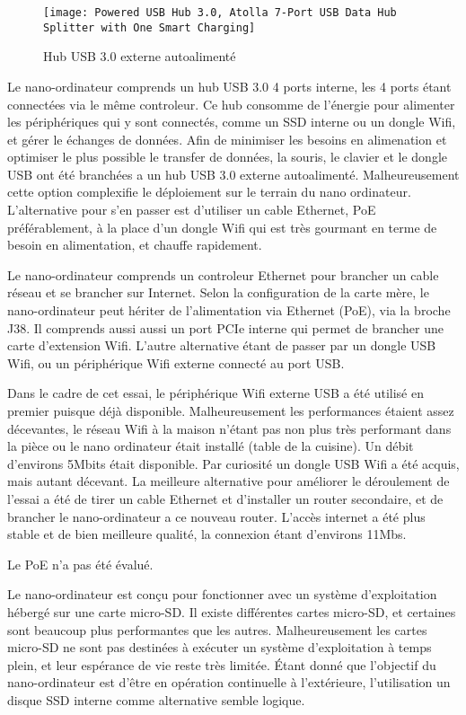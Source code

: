 \begin{figure}
    \centering
    \texttt{[image: Powered USB Hub 3.0, Atolla 7-Port USB Data Hub Splitter with One Smart Charging]}
    \caption{Hub USB 3.0 externe autoalimenté}
    \label{fig:hubusb}
\end{figure}
\par Le nano-ordinateur comprends un hub USB 3.0 4 ports interne, les 4 ports étant connectées via le même controleur. Ce hub consomme de l'énergie pour alimenter les périphériques qui y sont connectés, comme un SSD interne ou un dongle Wifi, et gérer le échanges de données. Afin de minimiser les besoins en alimenation et optimiser le plus possible le transfer de données, la souris, le clavier et le dongle USB ont été branchées a un hub USB 3.0 externe autoalimenté. Malheureusement cette option complexifie le déploiement sur le terrain du nano ordinateur. L'alternative pour s'en passer est d'utiliser un cable Ethernet, PoE préférablement, à la place d'un dongle Wifi qui est très gourmant en terme de besoin en alimentation, et chauffe rapidement.
\par Le nano-ordinateur comprends un controleur Ethernet pour brancher un cable réseau et se brancher sur Internet. Selon la configuration de la carte mère, le nano-ordinateur peut hériter de l'alimentation via Ethernet (PoE), via la broche J38. Il comprends aussi aussi un port PCIe interne qui permet de brancher une carte d'extension Wifi. L'autre alternative étant de passer par un dongle USB Wifi, ou un périphérique Wifi externe connecté au port USB. 
\par Dans le cadre de cet essai, le périphérique Wifi externe USB a été utilisé en premier puisque déjà disponible. Malheureusement les performances étaient assez décevantes, le réseau Wifi à la maison n'étant pas non plus très performant dans la pièce ou le nano ordinateur était installé (table de la cuisine). Un débit d'environs 5Mbits était disponible. Par curiosité un dongle USB Wifi a été acquis, mais autant décevant. La meilleure alternative pour améliorer le déroulement de l'essai a été de tirer un cable Ethernet et d'installer un router secondaire, et de brancher le nano-ordinateur a ce nouveau router. L'accès internet a été plus stable et de bien meilleure qualité, la connexion étant d'environs 11Mbs. 
\par Le PoE n'a pas été évalué. 
\par Le nano-ordinateur est conçu pour fonctionner avec un système  d'exploitation hébergé sur une carte micro-SD. Il existe différentes cartes micro-SD, et certaines sont  beaucoup plus performantes que les autres. Malheureusement les cartes micro-SD ne sont pas destinées à exécuter un système d'exploitation à temps plein, et leur espérance de vie reste très limitée.  Étant donné que l'objectif du nano-ordinateur est d'être en opération continuelle à l'extérieure, l'utilisation un disque SSD interne comme alternative semble logique.
